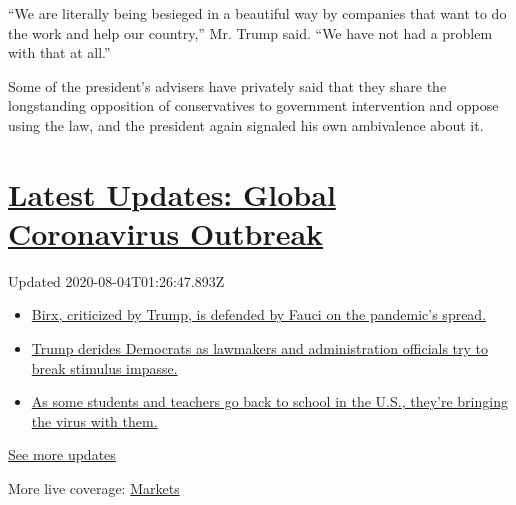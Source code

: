 ``We are literally being besieged in a beautiful way by companies that
want to do the work and help our country,'' Mr. Trump said. ``We have
not had a problem with that at all.''

Some of the president's advisers have privately said that they share the
longstanding opposition of conservatives to government intervention and
oppose using the law, and the president again signaled his own
ambivalence about it.

\hypertarget{latest-updates-global-coronavirus-outbreak}{%
\section{\texorpdfstring{\href{https://www.nytimes.com/2020/08/03/world/coronavirus-covid-19.html?action=click\&pgtype=Article\&state=default\&region=MAIN_CONTENT_1\&context=storylines_live_updates}{Latest
Updates: Global Coronavirus
Outbreak}}{Latest Updates: Global Coronavirus Outbreak}}\label{latest-updates-global-coronavirus-outbreak}}

Updated 2020-08-04T01:26:47.893Z

\begin{itemize}
\tightlist
\item
  \href{https://www.nytimes.com/2020/08/03/world/coronavirus-covid-19.html?action=click\&pgtype=Article\&state=default\&region=MAIN_CONTENT_1\&context=storylines_live_updates\#link-4e40df05}{Birx,
  criticized by Trump, is defended by Fauci on the pandemic's spread.}
\item
  \href{https://www.nytimes.com/2020/08/03/world/coronavirus-covid-19.html?action=click\&pgtype=Article\&state=default\&region=MAIN_CONTENT_1\&context=storylines_live_updates\#link-15e7f995}{Trump
  derides Democrats as lawmakers and administration officials try to
  break stimulus impasse.}
\item
  \href{https://www.nytimes.com/2020/08/03/world/coronavirus-covid-19.html?action=click\&pgtype=Article\&state=default\&region=MAIN_CONTENT_1\&context=storylines_live_updates\#link-4c85ed64}{As
  some students and teachers go back to school in the U.S., they're
  bringing the virus with them.}
\end{itemize}

\href{https://www.nytimes.com/2020/08/03/world/coronavirus-covid-19.html?action=click\&pgtype=Article\&state=default\&region=MAIN_CONTENT_1\&context=storylines_live_updates}{See
more updates}

More live coverage:
\href{https://www.nytimes.com/live/2020/08/03/business/stock-market-today-coronavirus?action=click\&pgtype=Article\&state=default\&region=MAIN_CONTENT_1\&context=storylines_live_updates}{Markets}


